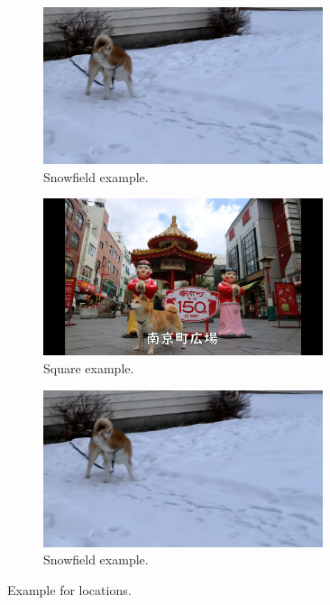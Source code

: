 \documentclass[letterpaper]{article}
\begin{document}
\begin{figure}[h]
\begin{subfigure}[]{0.4\textwidth}
	\centering
	\includegraphics[width=0.9\textwidth]{images/snowfield.jpg}
	\caption{Snowfield example.}
\label{fig:loc9}
\end{subfigure}
\begin{subfigure}[]{0.4\textwidth}
	\centering
	\includegraphics[width=0.9\textwidth]{images/square.jpg}
	\caption{Square example.}
	\label{fig:loc10}
\end{subfigure}

\begin{subfigure}[]{0.4\textwidth}
	\centering
	\includegraphics[width=0.9\textwidth]{images/snowfield.jpg}
	\caption{Snowfield example.}
\label{fig:loc11}
\end{subfigure}

\caption{Example for locations.}
\label{fig:location_example}
\end{figure}
\end{document}
